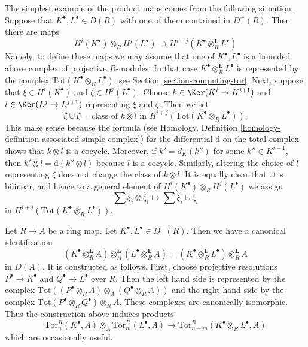 \noindent
The simplest example of the product maps comes from the following situation.
Suppose that $K^\bullet, L^\bullet \in D(R)$ with one of them contained
in $D^{-}(R)$. Then there are maps
\begin{equation}
\label{equation-simple-tor-product}
H^i(K^\bullet) \otimes_R H^j(L^\bullet)
\longrightarrow
H^{i + j}(K^\bullet \otimes_R^{\mathbf{L}} L^\bullet)
\end{equation}
Namely, to define these maps we may assume that one of $K^\bullet, L^\bullet$
is a bounded above complex of projective $R$-modules. In that case
$K^\bullet \otimes_R^{\mathbf{L}} L^\bullet$ is represented by the
complex $\text{Tot}(K^\bullet \otimes_R L^\bullet)$, see
Section \ref{section-computing-tor}.
Next, suppose that $\xi \in H^i(K^\bullet)$ and $\zeta \in H^j(L^\bullet)$.
Choose $k \in \Ker(K^i \to K^{i + 1})$ and
$l \in \Ker(L^j \to L^{j + 1})$ representing $\xi$ and $\zeta$.
Then we set
$$
\xi \cup \zeta =
\text{class of }k \otimes l\text{ in }
H^{i + j}(\text{Tot}(K^\bullet \otimes_R L^\bullet)).
$$
This make sense because the formula (see
Homology, Definition \ref{homology-definition-associated-simple-complex})
for the differential $\text{d}$ on the total complex shows that
$k \otimes l$ is a cocycle. Moreover, if $k' = d_K(k'')$ for some
$k'' \in K^{i - 1}$, then $k' \otimes l = \text{d}(k'' \otimes l)$
because $l$ is a cocycle. Similarly, altering the choice of $l$
representing $\zeta$ does not change the class of $k \otimes l$.
It is equally clear that $\cup$ is bilinear, and hence
to a general element of $H^i(K^\bullet) \otimes_R H^j(L^\bullet)$
we assign
$$
\sum \xi_i \otimes \zeta_i \longmapsto \sum \xi_i \cup \zeta_i
$$
in $H^{i + j}(\text{Tot}(K^\bullet \otimes_R L^\bullet))$.

\medskip\noindent
Let $R \to A$ be a ring map. Let $K^\bullet, L^\bullet \in D^{-}(R)$.
Then we have a canonical identification
\begin{equation}
\label{equation-pullback-derived-tensor-product}
(K^\bullet \otimes_R^{\mathbf{L}} A)
\otimes_A^{\mathbf{L}}
(L^\bullet \otimes_R^{\mathbf{L}} A)
=
(K^\bullet \otimes_R^{\mathbf{L}} L^\bullet) \otimes_R^{\mathbf{L}} A
\end{equation}
in $D(A)$. It is constructed as follows. First, choose projective resolutions
$P^\bullet \to K^\bullet$ and $Q^\bullet \to L^\bullet$
over $R$. Then the left hand side is represented by the complex
$\text{Tot}((P^\bullet \otimes_R A) \otimes_A (Q^\bullet \otimes_R A))$
and the right hand side by the complex
$\text{Tot}(P^\bullet \otimes_R Q^\bullet) \otimes_R A$. These
complexes are canonically isomorphic. Thus the construction above
induces products
$$
\text{Tor}^R_n(K^\bullet, A) \otimes_A \text{Tor}^R_m(L^\bullet, A)
\longrightarrow \text{Tor}_{n + m}^R(K^\bullet \otimes_R L^\bullet, A)
$$
which are occasionally useful.

